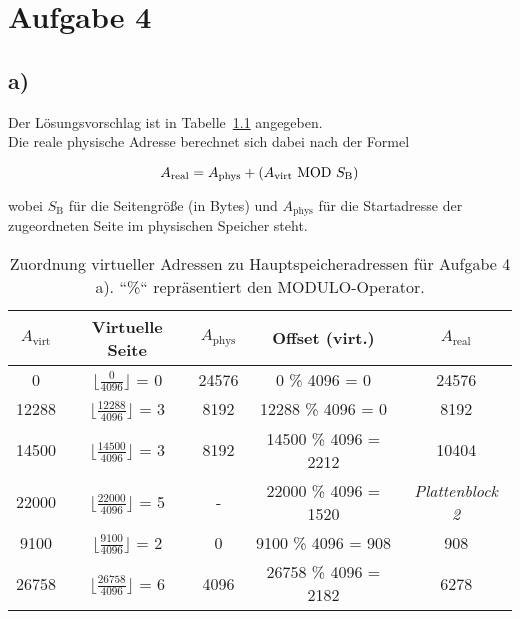 \chapter{Aufgabe 4}


\section{a)}
\noindent
Der Lösungsvorschlag ist in Tabelle~\ref{tab:adresszuordnung_a} angegeben.\\
Die reale physische Adresse berechnet sich dabei nach der Formel

\begin{equation}\notag
    A_{\text{real}} = A_{\text{phys}} + (A_{\text{virt}} \ \text{MOD} \ S_{\text{B}})
\end{equation}

\noindent
wobei $S_{\text{B}}$ für die Seitengröße (in Bytes) und $A_{\text{phys}}$ für die Startadresse der zugeordneten Seite im physischen Speicher steht.

\begin{table}[h!]
    \setlength{\tabcolsep}{0.5em}
    \def\arraystretch{1.5}
    \centering
    \begin{tabular}{|c|c|c|c|c|}
        \hline
        $A_{\text{virt}}$ & Virtuelle Seite              & $A_{\text{phys}}$ &  Offset (virt.) & $A_{\text{real}}$\\
        \hline
        0     & $\lfloor \frac{0}{4096} \rfloor$ = 0      & 24576 & 0 \% 4096     = 0     & 24576 \\
        \hline
        12288 & $\lfloor \frac{12288}{4096} \rfloor$ = 3  & 8192     & 12288 \% 4096 = 0     & 8192 \\
        \hline
        14500  & $\lfloor \frac{14500}{4096} \rfloor$ = 3 & 8192 & 14500 \% 4096 = 2212   & 10404 \\
        \hline
        22000  & $\lfloor \frac{22000}{4096} \rfloor$ = 5 & -    & 22000 \% 4096 = 1520   & \textit{Plattenblock 2}  \\
        \hline
        9100   & $\lfloor \frac{9100}{4096} \rfloor$ = 2  & 0    & 9100 \% 4096 = 908     & 908\\
        \hline
        26758  & $\lfloor \frac{26758}{4096} \rfloor$ = 6 & 4096 & 26758 \% 4096 = 2182   & 6278 \\
        \hline
    \end{tabular}
    \caption{Zuordnung virtueller Adressen zu Hauptspeicheradressen für Aufgabe 4 a). ``\%`` repräsentiert den MODULO-Operator. }
    \label{tab:adresszuordnung_a}
\end{table}


